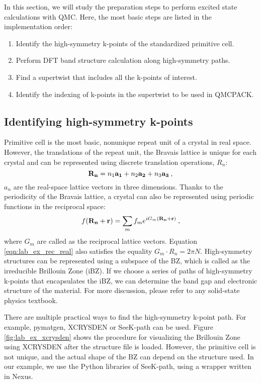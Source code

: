 In this section, we will study the preparation steps to perform excited state calculations with QMC. 
Here, the most basic steps are listed in the implementation order:
\begin{enumerate}
	\item Identify the high-symmetry k-points of the standardized primitive cell. 
	\item Perform DFT band structure calculation along high-symmetry paths.
	\item Find a supertwist that includes all the k-points of interest.
	\item Identify the indexing of k-points in the supertwist to be used in QMCPACK.
\end{enumerate}

\subsection{Identifying high-symmetry k-points}\label{sec:lab_ex_highk}
Primitive cell is the most basic, nonunique repeat unit of a crystal in real space. 
However, the translations of the repeat unit, the Bravais lattice is unique for each crystal and can be represented using discrete translation operations, $R_n$:
\begin{equation}
{\bf R_n} = n_1{\bf a_1} + n_2{\bf a_2} + n_3{\bf a_3}\:,
\end{equation}
$a_n$ are the real-space lattice vectors in three dimensions. Thanks to the periodicity of the Bravais lattice, a crystal can also be represented using periodic functions in the reciprocal space:
\begin{equation}
f({\bf R_n + r})= \sum_{m}f_me^{iG_m({\bf R_n+r})}\label{eqn:lab_ex_rec_real}\:,
\end{equation}
where $G_m$ are called as the reciprocal lattice vectors. Equation \ref{eqn:lab_ex_rec_real} also satisfies the equality $G_m\cdot{R_n}=2{\pi}N$. High-symmetry structures can be represented using a subspace of the BZ, which is called as the irreducible Brillouin Zone (iBZ). If we choose a series of  paths of high-symmetry k-points that encapsulates the iBZ, we can determine the band gap and electronic structure of the material. For more discussion, please refer to any solid-state physics textbook. 

There are multiple practical ways to find the high-symmetry k-point path. 
For example, pymatgen, \cite{Ong2013} XCRYSDEN \cite{Kokalj1999} or SeeK-path \cite{Hinuma2017} can be used. 
Figure \ref{fig:lab_ex_xcrysden} shows the procedure for visualizing the Brillouin Zone using XCRYSDEN after the structure file is loaded. 
However, the primitive cell is not unique, and the actual shape of the BZ can depend on the structure used. 
In our example, we use the Python libraries of SeeK-path, using a wrapper written in Nexus. 

